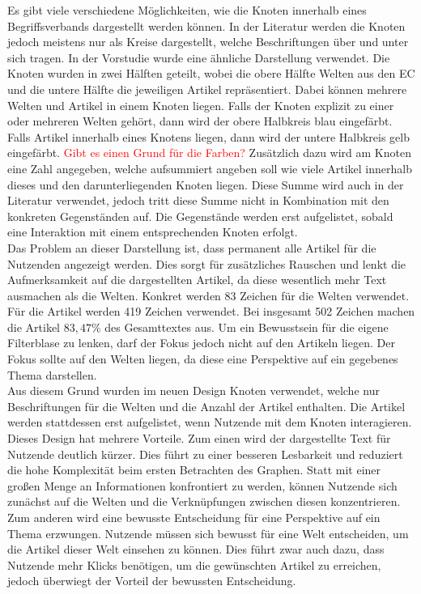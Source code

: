 Es gibt viele verschiedene Möglichkeiten, wie die Knoten innerhalb eines Begriffsverbands dargestellt werden können.
In der Literatur werden die Knoten jedoch meistens nur als Kreise dargestellt, welche Beschriftungen über und unter sich tragen.
In der Vorstudie wurde eine ähnliche Darstellung verwendet.
Die Knoten wurden in zwei Hälften geteilt, wobei die obere Hälfte Welten aus den \ac{EC} und die untere Hälfte die jeweiligen Artikel repräsentiert.
Dabei können mehrere Welten und Artikel in einem Knoten liegen.
Falls der Knoten explizit zu einer oder mehreren Welten gehört, dann wird der obere Halbkreis blau eingefärbt.
Falls Artikel innerhalb eines Knotens liegen, dann wird der untere Halbkreis gelb eingefärbt. \textcolor{red}{Gibt es einen Grund für die Farben?}
Zusätzlich dazu wird am Knoten eine Zahl angegeben, welche aufsummiert angeben soll wie viele Artikel innerhalb dieses und den darunterliegenden Knoten liegen.
Diese Summe wird auch in der Literatur verwendet, jedoch tritt diese Summe nicht in Kombination mit den konkreten Gegenständen auf.
Die Gegenstände werden erst aufgelistet, sobald eine Interaktion mit einem entsprechenden Knoten erfolgt. \\

Das Problem an dieser Darstellung ist, dass permanent alle Artikel für die Nutzenden angezeigt werden.
Dies sorgt für zusätzliches Rauschen und lenkt die Aufmerksamkeit auf die dargestellten Artikel, da diese wesentlich mehr Text ausmachen als die Welten.
Konkret werden 83 Zeichen für die Welten verwendet.
Für die Artikel werden 419 Zeichen verwendet.
Bei insgesamt 502 Zeichen machen die Artikel $83,47\%$ des Gesamttextes aus.
Um ein Bewusstsein für die eigene Filterblase zu lenken, darf der Fokus jedoch nicht auf den Artikeln liegen.
Der Fokus sollte auf den Welten liegen, da diese eine Perspektive auf ein gegebenes Thema darstellen.\\

Aus diesem Grund wurden im neuen Design Knoten verwendet, welche nur Beschriftungen für die Welten und die Anzahl der Artikel enthalten.
Die Artikel werden stattdessen erst aufgelistet, wenn Nutzende mit dem Knoten interagieren.
Dieses Design hat mehrere Vorteile.
Zum einen wird der dargestellte Text für Nutzende deutlich kürzer.
Dies führt zu einer besseren Lesbarkeit und reduziert die hohe Komplexität beim ersten Betrachten des Graphen.
Statt mit einer großen Menge an Informationen konfrontiert zu werden, können Nutzende sich zunächst auf die Welten und die Verknüpfungen zwischen diesen konzentrieren.
Zum anderen wird eine bewusste Entscheidung für eine Perspektive auf ein Thema erzwungen.
Nutzende müssen sich bewusst für eine Welt entscheiden, um die Artikel dieser Welt einsehen zu können.
Dies führt zwar auch dazu, dass Nutzende mehr Klicks benötigen, um die gewünschten Artikel zu erreichen, jedoch überwiegt der Vorteil der bewussten Entscheidung.\\

